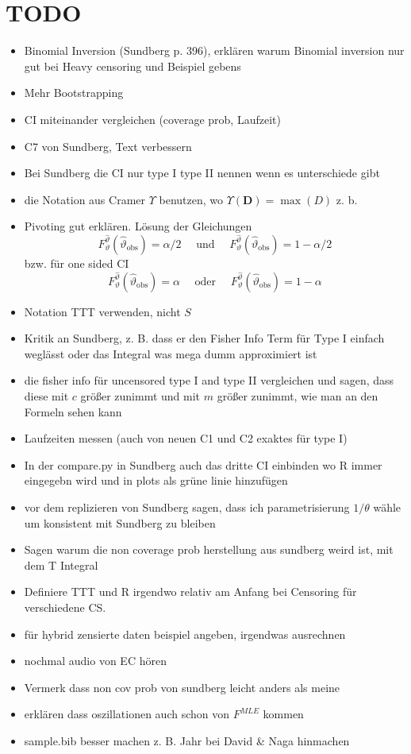 

\chapter{TODO}



\begin{itemize}
	\item Binomial Inversion (Sundberg p. 396), erklären warum Binomial inversion nur gut bei Heavy censoring und Beispiel gebens
	\item Mehr Bootstrapping
	\item CI miteinander vergleichen (coverage prob, Laufzeit)
	\item C7 von Sundberg, Text verbessern
	\item 
	Bei Sundberg die CI nur type I type II nennen wenn es unterschiede gibt
	\item 
	die Notation aus Cramer $\Upsilon$ benutzen, wo $\Upsilon(\mathbf D) = \max(D)$ z. b. 
	\item 
	Pivoting gut erklären. Lösung der Gleichungen 
	\[
	F^{\hat \vartheta}_{\vartheta}(\hat \vartheta_{\text{obs}}) = \alpha / 2
	\quad
	\text{ und }
	\quad
	F^{\hat \vartheta}_{\vartheta}(\hat \vartheta_{\text{obs}}) = 1 - \alpha / 2
	\]
	bzw. für one sided CI
	\[
	F^{\hat \vartheta}_{\vartheta}(\hat 	\vartheta_{\text{obs}}) = \alpha
	\quad
	\text{ oder }
	\quad
	F^{\hat \vartheta}_{\vartheta}(\hat \vartheta_{\text{obs}}) = 1 - \alpha
	\]
	\item 
	Notation TTT verwenden, nicht $S$
	\item 
	Kritik an Sundberg, z. B. dass er den Fisher Info Term für Type I einfach weglässt oder das Integral was mega dumm approximiert ist
	\item 
	die fisher info für uncensored type I and type II vergleichen und sagen, dass diese mit $c$ größer zunimmt und mit $m$ größer zunimmt, wie man an den Formeln sehen kann
	\item 
	Laufzeiten messen (auch von neuen C1 und C2 exaktes für type I)
	\item 
	In der compare.py in Sundberg auch das dritte CI einbinden wo R immer eingegebn wird und in plots als grüne linie hinzufügen
	\item 
	vor dem replizieren von Sundberg sagen, dass ich parametrisierung $1 / \theta$ wähle um konsistent mit Sundberg zu bleiben
	\item 
	Sagen warum die non coverage prob herstellung aus sundberg weird ist, mit dem T Integral
	\item 
	Definiere TTT und R irgendwo relativ am Anfang bei Censoring für verschiedene CS.
	\item 
	für hybrid zensierte daten beispiel angeben, irgendwas ausrechnen
	\item
	nochmal audio von EC hören
	\item 
	Vermerk dass non cov prob von sundberg leicht anders als meine 
	\item erklären dass oszillationen auch schon von $F^{MLE}$ kommen
	\item 
	sample.bib besser machen z. B. Jahr bei David \& Naga hinmachen
\end{itemize}




